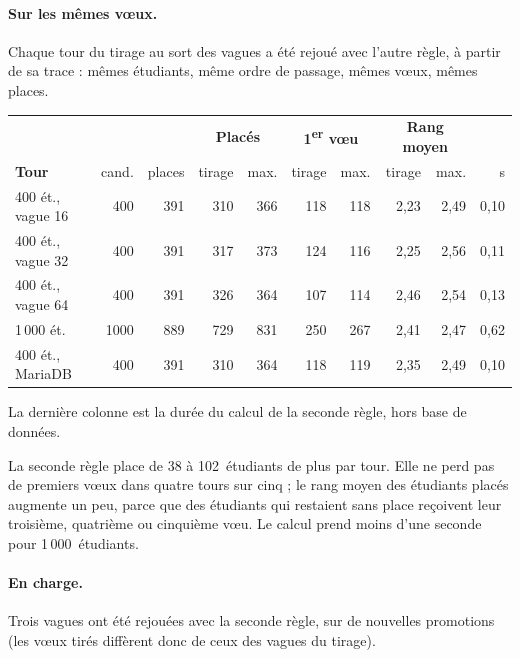 \documentclass[11pt,a4paper]{article}
\begin{document}
\paragraph{Sur les mêmes vœux.} Chaque tour du tirage au sort des vagues a été rejoué avec l'autre
règle, à partir de sa trace : mêmes étudiants, même ordre de passage, mêmes vœux, mêmes places.

\begin{center}
\small
\begin{tabularx}{\linewidth}{@{}X r r r r r r r r r@{}}
\toprule
& & & \multicolumn{2}{c}{\textbf{Placés}} & \multicolumn{2}{c}{\textbf{1\textsuperscript{er} vœu}} & \multicolumn{2}{c}{\textbf{Rang moyen}} & \\
\textbf{Tour} & cand. & places & tirage & max. & tirage & max. & tirage & max. & s \\
\midrule
400 ét., vague 16 & 400 & 391 & 310 & 366 & 118 & 118 & 2{,}23 & 2{,}49 & 0{,}10 \\
400 ét., vague 32 & 400 & 391 & 317 & 373 & 124 & 116 & 2{,}25 & 2{,}56 & 0{,}11 \\
400 ét., vague 64 & 400 & 391 & 326 & 364 & 107 & 114 & 2{,}46 & 2{,}54 & 0{,}13 \\
1\,000 ét. & 1000 & 889 & 729 & 831 & 250 & 267 & 2{,}41 & 2{,}47 & 0{,}62 \\
400 ét., MariaDB & 400 & 391 & 310 & 364 & 118 & 119 & 2{,}35 & 2{,}49 & 0{,}10 \\
\bottomrule
\end{tabularx}
\end{center}

\noindent La dernière colonne est la durée du calcul de la seconde règle, hors base de données.

La seconde règle place de 38 à 102~étudiants de plus par tour. Elle ne perd pas de premiers vœux
dans quatre tours sur cinq ; le rang moyen des étudiants placés augmente un peu, parce que des
étudiants qui restaient sans place reçoivent leur troisième, quatrième ou cinquième vœu. Le calcul
prend moins d'une seconde pour 1\,000~étudiants.

\paragraph{En charge.} Trois vagues ont été rejouées avec la seconde règle, sur de nouvelles
promotions (les vœux tirés diffèrent donc de ceux des vagues du tirage).
\end{document}
